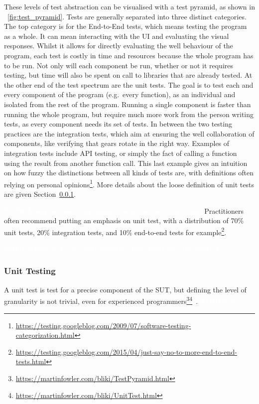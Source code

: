 \documentclass[11pt]{sdm_internship}
\newcommand{\todo}[1]{\colorbox{Red!75}{\textcolor{white}{\textbf{TODO\ifx&#1&\else: #1\fi}}}}
\theoremstyle{definition}
\begin{document}
These levels of test abstraction can be visualised with a test pyramid, as shown in \figurename~\ref{fig:test_pyramid}.
Tests are generally separated into three distinct categories.
The top category is for the End-to-End tests, which means testing the program as a whole.
It can mean interacting with the UI and evaluating the visual responses.
Whilst it allows for directly evaluating the well behaviour of the program, each test is costly in time and resources because the whole program has to be run.
Not only will each component be run, whether or not it requires testing, but time will also be spent on call to libraries that are already tested.
At the other end of the test spectrum are the unit tests.
The goal is to test each and every component of the program (e.g.\ every function), as an individual and isolated from the rest of the program.
Running a single component is faster than running the whole program, but require much more work from the person writing tests, as every component needs its set of tests.
In between the two testing practices are the integration tests, which aim at ensuring the well collaboration of components, like verifying that gears rotate in the right way.
Examples of integration tests include API testing, or simply the fact of calling a function using the result from another function call.
This last example gives an intuition on how fuzzy the distinctions between all kinds of tests are, with definitions often relying on personal opinions\footnote{\url{https://testing.googleblog.com/2009/07/software-testing-categorization.html}}.
More details about the loose definition of unit tests are given Section~\ref{sssec:unit_testing}.

\todo{why we use a pyramid}
Practitioners often recommend putting an emphasis on unit test, with a distribution of 70\% unit tests, 20\% integration tests, and 10\% end-to-end tests for example\footnote{\url{https://testing.googleblog.com/2015/04/just-say-no-to-more-end-to-end-tests.html}}.

\todo{how tests are automated}

\subsubsection{Unit Testing}%
\label{sssec:unit_testing}

A unit test is test for a precise component of the SUT, but defining the level of granularity is not trivial, even for experienced programmers\footnote{\url{https://martinfowler.com/bliki/TestPyramid.html}}\footnote{\url{https://martinfowler.com/bliki/UnitTest.html}}~\cite{runeson2006survey}.
\todo{}
\end{document}
